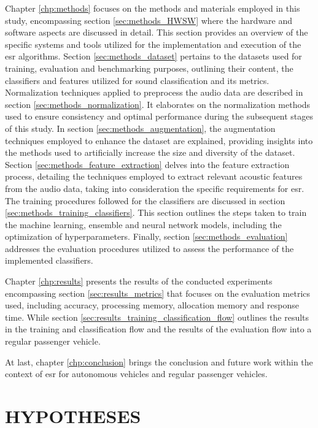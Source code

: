 Chapter \ref{chp:methods} focuses on the methods and materials employed in this study, encompassing section \ref{sec:methods_HWSW} where the hardware and software aspects are discussed in detail. This section provides an overview of the specific systems and tools utilized for the implementation and execution of the \gls{esr} algorithms. Section \ref{sec:methods_dataset} pertains to the datasets used for training, evaluation and benchmarking purposes, outlining their content, the classifiers and features utilized for sound classification and its metrics. Normalization techniques applied to preprocess the audio data are described in section \ref{sec:methods_normalization}. It elaborates on the normalization methods used to ensure consistency and optimal performance during the subsequent stages of this study. In section \ref{sec:methods_augmentation}, the augmentation techniques employed to enhance the dataset are explained, providing insights into the methods used to artificially increase the size and diversity of the dataset. Section \ref{sec:methods_feature_extraction} delves into the feature extraction process, detailing the techniques employed to extract relevant acoustic features from the audio data, taking into consideration the specific requirements for \gls{esr}. The training procedures followed for the classifiers are discussed in section \ref{sec:methods_training_classifiers}. This section outlines the steps taken to train the machine learning, ensemble and neural network models, including the optimization of hyperparameters. Finally, section \ref{sec:methods_evaluation} addresses the evaluation procedures utilized to assess the performance of the implemented classifiers.

Chapter \ref{chp:results} presents the results of the conducted experiments encompassing section \ref{sec:results_metrics} that focuses on the evaluation metrics used, including accuracy, processing memory, allocation memory and response time. While section \ref{sec:results_training_classification_flow} outlines the results in the training and classification flow and the results of the evaluation flow into a regular passenger vehicle.

At last, chapter \ref{chp:conclusion} brings the conclusion and future work within the context of \gls{esr} for autonomous vehicles and regular passenger vehicles.


\section{HYPOTHESES}
\label{sec:introduction_hypotheses}

